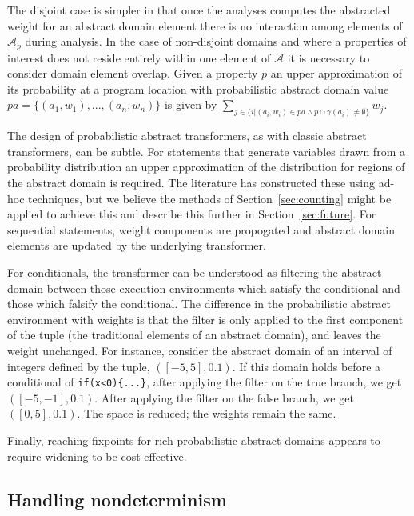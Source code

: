 The disjoint case is simpler in that once the analyses computes
the abstracted weight for an abstract domain element there is
no interaction among elements of $\mathcal{A}_p$ during analysis.
In the case of non-disjoint domains and where a properties of interest
does not reside entirely within one element of $\mathcal{A}$ it is
necessary to consider domain element overlap. 
Given a property $p$ an upper approximation of its probability 
at a program location with probabilistic abstract domain
value $pa = \{(a_1,w_1), ..., (a_n,w_n)\}$
is given by $\sum_{j \in \{ i \vert (a_i,w_i) \in pa \wedge   
p \cap \gamma(a_i) \not= \emptyset\}} w_j$.

The design of probabilistic abstract transformers, as with 
classic abstract transformers, can be subtle.
For statements that generate variables drawn from a probability
distribution an upper approximation of the distribution for
regions of the abstract domain is required.  The literature
has constructed these using ad-hoc techniques, but we believe
the methods of Section~\ref{sec:counting} might be applied to 
achieve this and describe this further in Section~\ref{sec:future}.
For sequential statements, weight components are propogated
and abstract domain elements are updated by the underlying transformer.

For conditionals, the transformer can be understood
as filtering the abstract domain between those execution environments which
satisfy the conditional and those which falsify the conditional. 
The difference in the probabilistic abstract environment with weights 
is that the filter is only applied to the first component of
the tuple (the traditional elements of an abstract domain), 
and leaves the weight unchanged.
For instance, consider the abstract domain of an interval of 
integers defined by the tuple, $([-5,5],0.1)$. 
If this domain holds before a conditional of 
{\tt if(x<0)\{...\}}, after applying the filter on the true branch, 
we get $([-5,-1],0.1)$. 
After applying the filter on the false branch, we get $([0,5],0.1)$.
The space is reduced; the weights remain the same.

Finally, reaching fixpoints for rich probabilistic abstract domains
appears to require widening \cite{Monniaux,Esparza:SAS11} to be
cost-effective.

\subsection{Handling nondeterminism}

